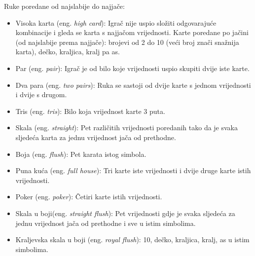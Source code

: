 Ruke poredane od najslabije do najjače:
\begin{itemize}
	\item Visoka karta (eng. \textit{high card}): Igrač nije uspio složiti odgovarajuće kombinacije i gleda se karta s najjačom vrijednosti. Karte poredane po jačini (od najslabije prema najjače):
	brojevi od 2 do 10 (veći broj znači snažnija karta), dečko, kraljica, kralj pa as.
	
	\item Par (eng. \textit{pair}): Igrač je od bilo koje vrijednosti uspio skupiti dvije iste karte.
	\item Dva para (eng. \textit{two pairs}): Ruka se sastoji od dvije karte s jednom vrijednosti i dvije s drugom.
	\item Tris (eng. \textit{tris}): Bilo koja vrijednost karte 3 puta.
	\item Skala (eng. \textit{straight}): Pet različitih vrijednosti poredanih tako da je svaka sljedeća karta za jednu vrijednost jača od prethodne.
	
	\item Boja (eng. \textit{flush}): Pet karata istog simbola.
	\item Puna kuća (eng. \textit{full house}): Tri karte iste vrijednosti i dvije druge karte istih vrijednosti.
	\item Poker (eng. \textit{poker}): Četiri karte istih vrijednosti.
	\item Skala u boji(eng. \textit{straight flush}): Pet vrijednosti gdje je svaka sljedeća za jednu vrijednost jača od prethodne i sve u istim simbolima.
	
	\item Kraljevska skala u boji (eng. \textit{royal flush}): 10, dečko, kraljica, kralj, as u istim simbolima.
\end{itemize}


